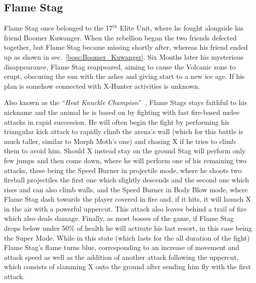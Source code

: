 \subsection{Flame Stag}\label{boss:Flame_stag}

Flame Stag once belonged to the 17$^{th}$ Elite Unit, where he fought alongside his friend Boomer Kuwanger.  When the rebellion began the two friends defected together, but Flame Stag became missing shortly after, whereas his friend ended up as shown in sec.~\ref{boss:Boomer_Kuwanger}. Six Months later his mysterious disappearance, Flame Stag reappeared, aiming to cause the Volcanic zone to erupt, obscuring the sun with the ashes and giving start to a new ice age. If his plan is somehow connected with X-Hunter activities is unknown.

Also known as the ``\textit{Heat Knuckle Champion}''~\cite{book:MMX_Complete_art}, Flame Stags stays faithful to his nickname and the animal he is based on by fighting with fast fire-based melee attacks in rapid succession. He will often begin the fight by performing his triangular kick attack to rapidly climb the arena's wall (which for this battle is much taller, similar to Morph Moth's one) and chasing X if he tries to climb them to avoid him. Should X instead stay on the ground Stag will perform only few jumps and then come down, where he will perform one of his remaining two attacks, these being the Speed Burner in projectile mode, where he shoots two fireball projectiles the first one which slightly descends and the second one which rises and can also climb walls, and the Speed Burner in Body Blow mode, where Flame Stag dash towards the player covered in fire and, if it hits, it will launch X in the air with a powerful uppercut. This attack also leaves behind a trail of fire which also deals damage. Finally, as most bosses of the game, if Flame Stag drops below under 50\% of health he will activate his last resort, in this case being the Super Mode. While in this state (which lasts for the all duration of the fight) Flame Stag's flame turns blue, corresponding to an increase of movement and attack speed as well as the addition of another attack following the uppercut, which consists of slamming X onto the ground after sending him fly with the first attack.

